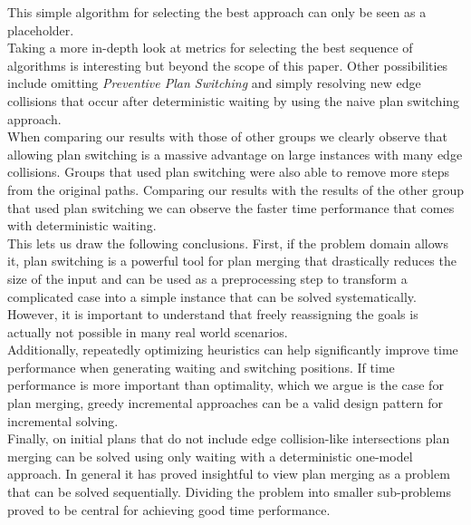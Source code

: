 \documentclass{llncs}
\begin{document}
This simple algorithm for selecting the best approach can only be seen as a placeholder.\\
Taking a more in-depth look at metrics for selecting the best sequence of algorithms is interesting but beyond the scope of this paper. 
Other possibilities include omitting \emph{Preventive Plan Switching} and simply resolving new edge collisions that occur after deterministic waiting by using the naive plan switching approach.\\
When comparing our results with those of other groups we clearly observe that allowing plan switching is a massive advantage on large instances with many edge collisions. Groups that used plan switching were also able to remove more steps from the original paths. Comparing our results with the results of the other group that used plan switching we can observe the faster time performance that comes with deterministic waiting.\\
This lets us draw the following conclusions.
First, if the problem domain allows it, plan switching is a powerful tool for plan merging that drastically reduces the size of the input and can be used as a preprocessing step to transform a complicated case into a simple instance that can be solved systematically. However, it is important to understand that freely reassigning the goals is actually not possible in many real world scenarios.
\\
Additionally, repeatedly optimizing heuristics can help significantly improve time performance when generating waiting and switching positions. If time performance is more important than optimality, which we argue is the case for plan merging, greedy incremental approaches can be a valid design pattern for incremental solving.\\
Finally, on initial plans that do not include edge collision-like intersections plan merging can be solved using only waiting with a deterministic one-model approach. In general it has proved insightful to view plan merging as a problem that can be solved sequentially. Dividing the problem into smaller sub-problems proved to be central for achieving good time performance.
\end{document}
